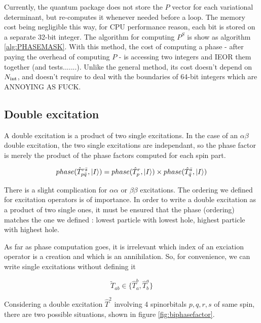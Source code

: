 \documentclass[./thesis.tex]{subfiles}
\begin{document}
Currently, the quantum package does not store the $P$ vector for each variational determinant, but re-computes it whenever needed before a loop. The memory cost being negligible this way, for CPU performance reason, each bit is stored on a separate 32-bit integer.
The algorithm for computing $P^S$ is show as algorithm \ref{alg:PHASEMASK}. 
With this method, the cost of computing a phase - after paying the overhead of computing $P$ - is accessing two integers and IEOR them together (and tests.......). Unlike the general method, its cost doesn't depend on ${N_\text{int}}$, and doesn't require to deal with the boundaries of 64-bit integers which are ANNOYING AS FUCK.
        

\subsection{Double excitation}







A double excitation is a product of two single excitations.
In the case of an $\alpha \beta$ double excitation, the two single excitations are independant, so the phase factor is merely the product of the phase factors computed for each spin part. 


$$phase(\hat T_{p \bar q}^{r \bar s}, \ket I) = phase(\hat T_{p}^{r}, \ket I) \times phase(\hat T_{ \bar q}^{ \bar s}, \ket I) $$


There is a slight complication for $\alpha \alpha$ or $\beta \beta$ excitations. The ordering we defined for excitation operators is of importance. In order to write a double excitation as a product of two single ones, it must be ensured that the phase (ordering) matches the one we defined : lowest particle with lowest hole, highest particle with highest hole.

As far as phase computation goes, it is irrelevant which index of an exciation operator is a creation and which is an annihilation. So, for convenience, we can write single excitations without defining it

$$\tilde T_{ab} \in \{\hat T_a^b, \hat T_b^a \}$$




Considering a double excitation $\hat T^2$ involving 4 spinorbitals $p,q,r,s$ of same spin, there are two possible situations, shown in figure \ref{fig:biphasefactor}. 



\end{document}
